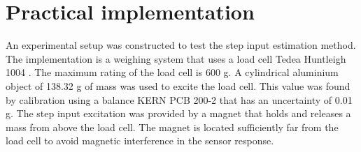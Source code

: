 


\section{Practical implementation} 
An experimental setup was constructed to test the step input estimation method.
The implementation is a weighing system that uses a load cell Tedea Huntleigh 1004 \citep{tedea1004}.
The maximum rating of the load cell is 600 g.
A cylindrical aluminium object of 138.32 g of mass was used to excite the load cell.
This value was found by calibration using a balance KERN PCB 200-2 that has an uncertainty of 0.01 g.
The step input excitation was provided by a magnet that holds and releases a mass from above the load cell.
The magnet is located sufficiently far from the load cell to avoid magnetic interference in the sensor response.

